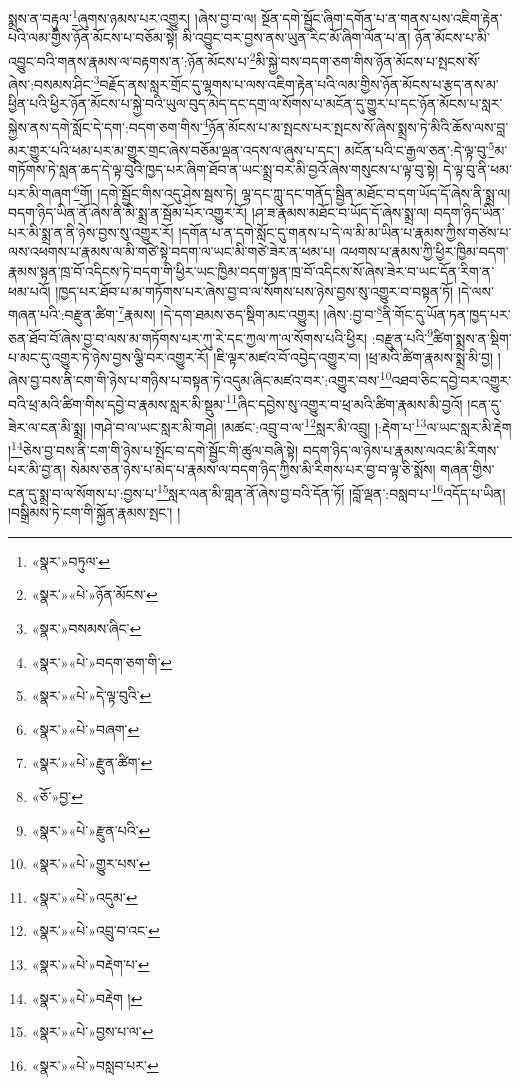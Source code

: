 སྨྲས་ན་བརྟུལ་\footnote{«སྣར་»བཏུལ་}ཞུགས་ཉམས་པར་འགྱུར། །ཞེས་བྱ་བ་ལ། སྔོན་དགེ་སྦྱོང་ཞིག་དགོན་པ་ན་གནས་པས་འཇིག་རྟེན་པའི་ལམ་གྱིས་ཉོན་མོངས་པ་བཅོམ་སྟེ། མི་འབྱུང་བར་བྱས་ནས་ཡུན་རིང་མོ་ཞིག་ལོན་པ་ན། ཉོན་མོངས་པ་མི་འབྱུང་བའི་གནས་རྣམས་ལ་བརྟགས་ན་:ཉོན་མོངས་པ་\footnote{«སྣར་»«པེ་»ཉོན་མོངས་}མི་སྐྱེ་བས་བདག་ཅག་གིས་ཉོན་མོངས་པ་སྤངས་སོ་ཞེས་:བསམས་ཤིང་\footnote{«སྣར་»བསམས་ཞིང་}བརྗོད་ནས་སླར་གྲོང་དུ་ལྷགས་པ་ལས་འཇིག་རྟེན་པའི་ལམ་གྱིས་ཉོན་མོངས་པ་རྩད་ནས་མ་ཕྱིན་པའི་ཕྱིར་ཉོན་མོངས་པ་སྐྱེ་བའི་ཡུལ་བུད་མེད་དང་དགྲ་ལ་སོགས་པ་མངོན་དུ་གྱུར་པ་དང་ཉོན་མོངས་པ་སླར་སྐྱེས་ནས་དགེ་སློང་དེ་དག་:བདག་ཅག་གིས་\footnote{«སྣར་»«པེ་»བདག་ཅག་གི་}ཉོན་མོངས་པ་མ་སྤངས་པར་སྤངས་སོ་ཞེས་སྨྲས་ཏེ་མིའི་ཆོས་ལས་བླ་མར་གྱུར་པའི་ཕམ་པར་མ་གྱུར་གྲང་ཞེས་བཅོམ་ལྡན་འདས་ལ་ཞུས་པ་དང་། མངོན་པའི་ང་རྒྱལ་ཅན་:དེ་ལྟ་བུ་\footnote{«སྣར་»«པེ་»དེ་ལྟ་བུའི་}མ་གཏོགས་ཏེ་སླན་ཆད་དེ་ལྟ་བུའི་ཁྱད་པར་ཞིག་ཐོབ་ན་ཡང་སྨྲ་བར་མི་བྱའོ་ཞེས་གསུངས་པ་ལྟ་བུ་སྟེ། དེ་ལྟ་བུ་ནི་ཕམ་པར་མི་གཞག་\footnote{«སྣར་»«པེ་»བཞག་}གོ། །དགེ་སྦྱོང་གིས་འདུ་ཤེས་སྦས་ཏེ། ལྷ་དང་ཀླུ་དང་གནོད་སྦྱིན་མཐོང་བ་དག་ཡོད་དོ་ཞེས་ནི་སྨྲ་ལ། བདག་ཉིད་ཡིན་ནོ་ཞེས་ནི་མི་སྨྲ་ན་སྦོམ་པོར་འགྱུར་རོ། །ཤ་ཟ་རྣམས་མཐོང་བ་ཡོད་དོ་ཞེས་སྨྲ་ལ། བདག་ཉིད་ཡིན་པར་མི་སྨྲ་ན་ནི་ཉེས་བྱས་སུ་འགྱུར་རོ། །དགོན་པ་ན་དགེ་སློང་དུ་གནས་པ་དེ་ལ་མི་མ་ཡིན་པ་རྣམས་ཀྱིས་གཙེས་པ་ལས་འཕགས་པ་རྣམས་ལ་མི་གཙེ་སྟེ་བདག་ལ་ཡང་མི་གཙེ་ཟེར་ན་ཕམ་པ། འཕགས་པ་རྣམས་ཀྱི་ཕྱིར་ཁྱིམ་བདག་རྣམས་སྟན་ཁྲ་བོ་འདིངས་ཏེ་བདག་གི་ཕྱིར་ཡང་ཁྱིམ་བདག་སྟན་ཁྲ་བོ་འདིངས་སོ་ཞེས་ཟེར་བ་ཡང་དོན་རིག་ན་ཕམ་པའོ། །ཁྱད་པར་ཐོབ་པ་མ་གཏོགས་པར་ཞེས་བྱ་བ་ལ་སོགས་པས་ཉེས་བྱས་སུ་འགྱུར་བ་བསྟན་ཏོ། །དེ་ལས་གཞན་པའི་:བརྫུན་ཚིག་\footnote{«སྣར་»«པེ་»རྫུན་ཚིག་}རྣམས། །དེ་དག་ཐམས་ཅད་སྡིག་མང་འགྱུར། །ཞེས་:བྱ་བ་\footnote{«ཅོ་»བྱ་}ནི་གོང་དུ་ཡོན་ཏན་ཁྱད་པར་ཅན་ཐོབ་བོ་ཞེས་བྱ་བ་ལས་མ་གཏོགས་པར་ཀུ་རེ་དང་ཀྱལ་ཀ་ལ་སོགས་པའི་ཕྱིར། :བརྫུན་པའི་\footnote{«སྣར་»«པེ་»རྫུན་པའི་}ཚིག་སྨྲས་ན་སྡིག་པ་མང་དུ་འགྱུར་ཏེ་ཉེས་བྱས་ལྕི་བར་འགྱུར་རོ། །ཇི་ལྟར་མཛའ་བོ་འབྱེད་འགྱུར་བ། །ཕྲ་མའི་ཚིག་རྣམས་སྨྲ་མི་བྱ། །ཞེས་བྱ་བས་ནི་ངག་གི་ཉེས་པ་གཉིས་པ་བསྟན་ཏེ་འདུམ་ཞིང་མཛའ་བར་:འགྱུར་བས་\footnote{«སྣར་»«པེ་»གྱུར་པས་}འཐབ་ཅིང་དབྱེ་བར་འགྱུར་བའི་ཕྲ་མའི་ཚིག་གིས་དབྱེ་བ་རྣམས་སླར་མི་སྡུམ་\footnote{«སྣར་»«པེ་»འདུམ་}ཞིང་དབྱེས་སུ་འགྱུར་བ་ཕྲ་མའི་ཚིག་རྣམས་མི་བྱའོ། །ངན་དུ་ཟེར་ལ་ངན་མི་སྨྲ། །གཤེ་བ་ལ་ཡང་སླར་མི་གཤེ། །མཚང་:འབྲུ་བ་ལ་\footnote{«སྣར་»«པེ་»འབྲུ་བ་འང་}སླར་མི་འབྲུ། །:རྡེག་པ་\footnote{«སྣར་»«པེ་»བརྡེག་པ་}ལ་ཡང་སླར་མི་རྡེག །\footnote{«སྣར་»«པེ་»བརྡེག །}ཅེས་བྱ་བས་ནི་ངག་གི་ཉེས་པ་སྤོང་བ་དགེ་སྦྱོང་གི་ཚུལ་བཞི་སྟེ། བདག་ཉིད་ལ་ཉེས་པ་རྣམས་ལའང་མི་རིགས་པར་མི་བྱ་ན། སེམས་ཅན་ཉེས་པ་མེད་པ་རྣམས་ལ་བདག་ཉིད་ཀྱིས་མི་རིགས་པར་བྱ་བ་ལྟ་ཅི་སྨོས། གཞན་གྱིས་ངན་དུ་སྨྲ་བ་ལ་སོགས་པ་:བྱས་པ་\footnote{«སྣར་»«པེ་»བྱས་པ་ལ་}སླར་ལན་མི་གླན་ནོ་ཞེས་བྱ་བའི་དོན་ཏོ། །བློ་ལྡན་:བསླབ་པ་\footnote{«སྣར་»«པེ་»བསླབ་པར་}འདོད་པ་ཡིན། །བསྒྲིམས་ཏེ་ངག་གི་སྐྱོན་རྣམས་སྤང་། །
